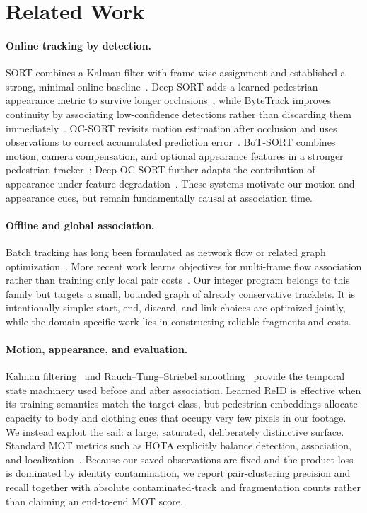 \section{Related Work}

\paragraph{Online tracking by detection.}
SORT combines a Kalman filter with frame-wise assignment and established a strong,
minimal online baseline~\cite{sort}.  Deep SORT adds a learned pedestrian appearance
metric to survive longer occlusions~\cite{deepsort}, while ByteTrack improves
continuity by associating low-confidence detections rather than discarding them
immediately~\cite{bytetrack}.  OC-SORT revisits motion estimation after occlusion and
uses observations to correct accumulated prediction error~\cite{ocsort}.  BoT-SORT
combines motion, camera compensation, and optional appearance features in a stronger
pedestrian tracker~\cite{botsort}; Deep OC-SORT further adapts the contribution of
appearance under feature degradation~\cite{deepocsort}.  These systems motivate our
motion and appearance cues, but remain fundamentally causal at association time.

\paragraph{Offline and global association.}
Batch tracking has long been formulated as network flow or related graph
optimization~\cite{networkflow}.  More recent work learns objectives for multi-frame
flow association rather than training only local pair costs~\cite{globalobjective}.
Our integer program belongs to this family but targets a small, bounded graph of
already conservative tracklets.  It is intentionally simple: start, end, discard,
and link choices are optimized jointly, while the domain-specific work lies in
constructing reliable fragments and costs.

\paragraph{Motion, appearance, and evaluation.}
Kalman filtering~\cite{kalman} and Rauch--Tung--Striebel smoothing~\cite{rts} provide
the temporal state machinery used before and after association.  Learned ReID is
effective when its training semantics match the target class, but pedestrian
embeddings allocate capacity to body and clothing cues that occupy very few pixels in
our footage.  We instead exploit the sail: a large, saturated, deliberately
distinctive surface.  Standard MOT metrics such as HOTA explicitly balance detection,
association, and localization~\cite{hotametric}.  Because our saved observations are
fixed and the product loss is dominated by identity contamination, we report
pair-clustering precision and recall together with absolute contaminated-track and
fragmentation counts rather than claiming an end-to-end MOT score.

